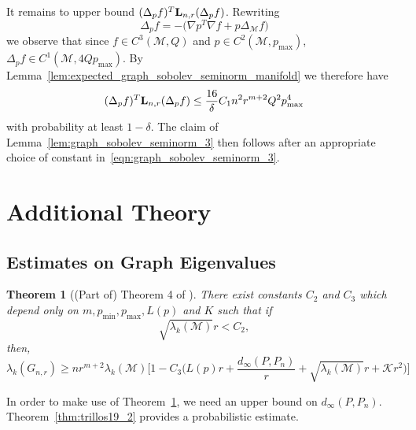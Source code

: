 \documentclass{article}
\newcommand{\1}{\mathbf{1}}
\newcommand{\Lap}{{\bf L}}
\newcommand{\mc}[1]{\mathcal{#1}}
\theoremstyle{alden}
\theoremstyle{aldenthm}
\newtheorem{theorem}{Theorem}
\theoremstyle{definition}
\theoremstyle{remark}
\begin{document}
It remains to upper bound $(\Delta_pf)^T \Lap_{n,r} (\Delta_pf)$. Rewriting
\begin{equation*}
\Delta_pf = -\bigl(\nabla p^T \nabla f + p \Delta_{\mc{M}} f\bigr)
\end{equation*}
we observe that since $f \in C^3(\mc{M}, Q)$ and $p \in C^2(\mc{M}, p_{\max})$, $\Delta_pf \in C^1(\mc{M},4Qp_{\max})$. By Lemma~\ref{lem:expected_graph_sobolev_seminorm_manifold} we therefore have
\begin{equation*}
(\Delta_pf)^T \Lap_{n,r} (\Delta_pf) \leq \frac{16}{\delta} C_1 n^2 r^{m + 2} Q^2 p_{\max}^4
\end{equation*}
with probability at least $1 - \delta$. The claim of Lemma~\ref{lem:graph_sobolev_seminorm_3} then follows after an appropriate choice of constant in~\eqref{eqn:graph_sobolev_seminorm_3}.


\section{Additional Theory}

\subsection{Estimates on Graph Eigenvalues}
\label{subsec:results_of_others}


\begin{theorem}[(Part of) Theorem 4 of \citep{trillos2019}]
	\label{thm:trillos19_1}
	There exist constants $C_2$ and $C_3$ which depend only on $m, p_{\min}, p_{\max}, L(p)$ and $K$ such that if 
	\begin{equation*}
	\sqrt{\lambda_k(\mc{M})} r < C_2,
	\end{equation*}
	then,
	\begin{equation*}
	\lambda_k(G_{n,r}) \geq n r^{m + 2}\lambda_k(\mc{M}) \Biggl[1 - C_3\biggl(L(p)r + \frac{d_{\infty}(P,P_n)}{r} + \sqrt{\lambda_k(\mc{M})}r + \mc{K}r^2\biggr)\Biggr]
	\end{equation*}
\end{theorem}

In order to make use of Theorem~\ref{thm:trillos19_1}, we need an upper bound on $d_{\infty}(P,P_n)$. Theorem~\ref{thm:trillos19_2} provides a probabilistic estimate.
\end{document}
